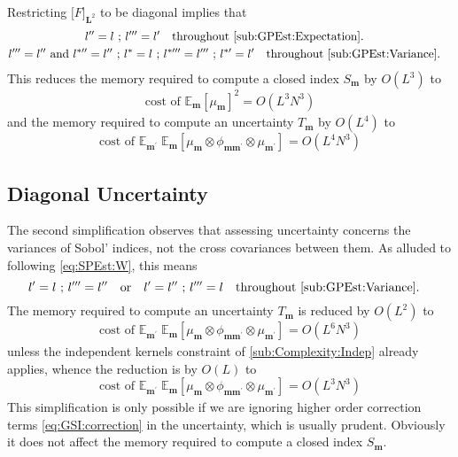 \documentclass[preprint,12pt]{elsarticle}
\newcommand*{\M}[1]{\ensuremath{#1}\xspace}
\newcommand*{\mi}[1]{\mathbf{#1}}
\newcommand*{\te}[2][]{\left\lbrack{#2}\right\rbrack_{#1}}
\newcommand*{\tte}[2][]{\lbrack{#2}\rbrack_{#1}}
\newcommand{\T}[1]{\text{#1}}
\newcommand*{\QT}[2][]{\M{\quad\T{#2}\ifthenelse{\equal{#1}{}}{\quad}{#1}}}
\newcommand*{\evt}[3][]{\mathbb{E}_{#3}^{#1}\!#2}
\begin{document}
    Restricting $\tte[\mi{L}^{2}]{F}$ to be diagonal implies that
    \begin{gather*}
        l^{\prime\prime} = l \T{ ; } l^{\prime\prime\prime} = l^{\prime} \QT{throughout \cref{sub:GPEst:Expectation}.}  \\ 
        l^{\prime\prime\prime} = l^{\prime\prime} \T{ and } l^{*\prime\prime} = l^{\prime\prime} \T{ ; } l^{*} = l \T{ ; } l^{*\prime\prime\prime} = l^{\prime\prime\prime} \T{ ; } l^{*\prime} = l^{\prime} \QT{throughout \cref{sub:GPEst:Variance}.}
    \end{gather*}
    This reduces the memory required to compute a closed index $S_{\mi{m}}$ by $O(L^3)$ to
    \begin{equation*}
        \T{cost of }\evt{\te[]{\mu_{\mi{m}}}^{2}}{\mi{m}} = O(L^{3}N^{3})
    \end{equation*}
    and the memory required to compute an uncertainty $T_{\mi{m}}$ by $O(L^4)$ to
    \begin{equation*}
        \T{cost of }\evt{\;\evt{\te[]{\mu_{\mi{m}} \otimes \phi_{\mi{mm^{\prime}}} \otimes \mu_{\mi{m^{\prime}}}}}}{\mi{m^{\prime}}}{\mi{m}} = O(L^{4}N^{3})
    \end{equation*}

    \subsection{Diagonal Uncertainty}\label{sub:Complexity:Diag}
    The second simplification observes that assessing uncertainty concerns the variances of Sobol' indices, not the cross covariances between them. 
    As alluded to following \cref{eq:SPEst:W}, this means
    \begin{equation*}
        l^{\prime} = l \T{ ; } l^{\prime\prime\prime} = l^{\prime\prime} \QT{or} 
        l^{\prime} = l^{\prime\prime} \T{ ; } l^{\prime\prime\prime} = l \QT{throughout \cref{sub:GPEst:Variance}.}   
    \end{equation*}
    The memory required to compute an uncertainty $T_{\mi{m}}$ is reduced by $O(L^2)$ to
    \begin{equation*}
        \T{cost of }\evt{\;\evt{\te[]{\mu_{\mi{m}} \otimes \phi_{\mi{mm^{\prime}}} \otimes \mu_{\mi{m^{\prime}}}}}}{\mi{m^{\prime}}}{\mi{m}} = O(L^{6}N^{3})
    \end{equation*}
    unless the independent kernels constraint of \cref{sub:Complexity:Indep} already applies, whence the reduction is by $O(L)$ to
    \begin{equation*}
        \T{cost of }\evt{\;\evt{\te[]{\mu_{\mi{m}} \otimes \phi_{\mi{mm^{\prime}}} \otimes \mu_{\mi{m^{\prime}}}}}}{\mi{m^{\prime}}}{\mi{m}} = O(L^{3}N^{3})
    \end{equation*}
    This simplification is only possible if we are ignoring higher order correction terms \cref{eq:GSI:correction} in the uncertainty, which is usually prudent.
    Obviously it does not affect the memory required to compute a closed index $S_{\mi{m}}$.
\end{document}
